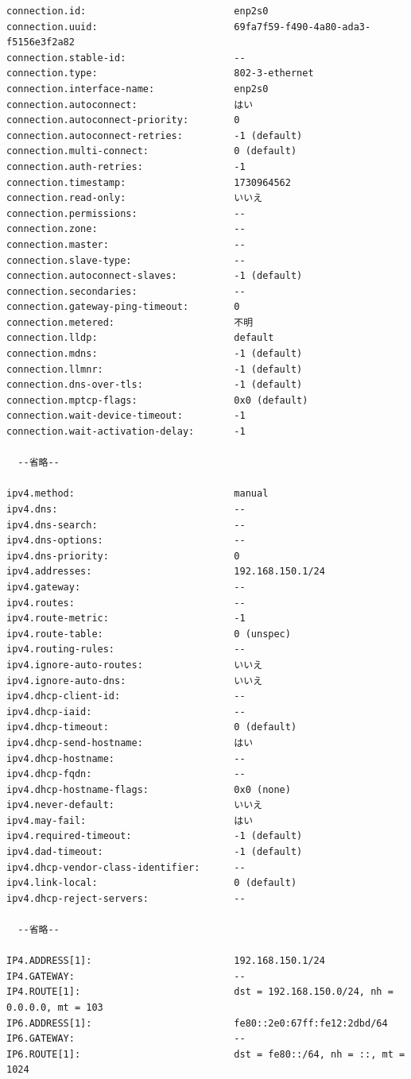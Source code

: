 \documentclass{ltjsarticle} %
\begin{document}
\begin{mdframed}
  \begin{verbatim}
connection.id:                          enp2s0
connection.uuid:                        69fa7f59-f490-4a80-ada3-f5156e3f2a82
connection.stable-id:                   --
connection.type:                        802-3-ethernet
connection.interface-name:              enp2s0
connection.autoconnect:                 はい
connection.autoconnect-priority:        0
connection.autoconnect-retries:         -1 (default)
connection.multi-connect:               0 (default)
connection.auth-retries:                -1
connection.timestamp:                   1730964562
connection.read-only:                   いいえ
connection.permissions:                 --
connection.zone:                        --
connection.master:                      --
connection.slave-type:                  --
connection.autoconnect-slaves:          -1 (default)
connection.secondaries:                 --
connection.gateway-ping-timeout:        0
connection.metered:                     不明
connection.lldp:                        default
connection.mdns:                        -1 (default)
connection.llmnr:                       -1 (default)
connection.dns-over-tls:                -1 (default)
connection.mptcp-flags:                 0x0 (default)
connection.wait-device-timeout:         -1
connection.wait-activation-delay:       -1
  
  --省略--

ipv4.method:                            manual
ipv4.dns:                               --
ipv4.dns-search:                        --
ipv4.dns-options:                       --
ipv4.dns-priority:                      0
ipv4.addresses:                         192.168.150.1/24
ipv4.gateway:                           --
ipv4.routes:                            --
ipv4.route-metric:                      -1
ipv4.route-table:                       0 (unspec)
ipv4.routing-rules:                     --
ipv4.ignore-auto-routes:                いいえ
ipv4.ignore-auto-dns:                   いいえ
ipv4.dhcp-client-id:                    --
ipv4.dhcp-iaid:                         --
ipv4.dhcp-timeout:                      0 (default)
ipv4.dhcp-send-hostname:                はい
ipv4.dhcp-hostname:                     --
ipv4.dhcp-fqdn:                         --
ipv4.dhcp-hostname-flags:               0x0 (none)
ipv4.never-default:                     いいえ
ipv4.may-fail:                          はい
ipv4.required-timeout:                  -1 (default)
ipv4.dad-timeout:                       -1 (default)
ipv4.dhcp-vendor-class-identifier:      --
ipv4.link-local:                        0 (default)
ipv4.dhcp-reject-servers:               --

  --省略--

IP4.ADDRESS[1]:                         192.168.150.1/24
IP4.GATEWAY:                            --
IP4.ROUTE[1]:                           dst = 192.168.150.0/24, nh = 0.0.0.0, mt = 103
IP6.ADDRESS[1]:                         fe80::2e0:67ff:fe12:2dbd/64
IP6.GATEWAY:                            --
IP6.ROUTE[1]:                           dst = fe80::/64, nh = ::, mt = 1024
  \end{verbatim}
  \end{mdframed}
\end{document}
